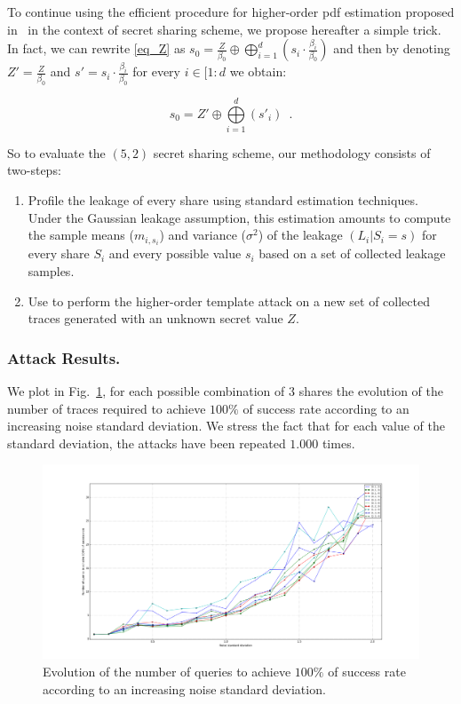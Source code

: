 \documentclass{llncs}
\begin{document}
To continue using the efficient procedure for higher-order pdf estimation proposed in~\cite{LPRRT14} in the context of secret sharing scheme, we propose hereafter a simple trick. In fact, we can rewrite \eqref{eq_Z} as $s_0=\frac{Z}{\beta_0}\oplus\bigoplus\limits_{i=1}^{d} (s_i \cdot \frac{\beta_i}{\beta_0})$ and then by denoting $Z'=\frac{Z}{\beta_0}$ and $s'=s_i \cdot \frac{\beta_i}{\beta_0}$ for every $i \in [ 1: d$ we obtain:

\begin{equation*}
s_0= Z' \oplus \bigoplus\limits_{i=1}^{d} (s'_i) \enspace.
\end{equation*}

So to evaluate the $(5,2)$ secret sharing scheme, our methodology consists of two-steps:

\begin{enumerate}
\item Profile the leakage of every share using standard estimation techniques. Under the Gaussian leakage assumption, this estimation amounts to compute the sample means ($m_{i,s_i}$) and variance ($\sigma^2$) of the leakage $(L_i | S_i = s)$ for every share $S_i$ and every possible value $s_i$ based on a set of collected leakage samples.
\item Use \label{eq_pdf} to perform the higher-order template attack on a new set of collected traces generated with an unknown secret value $Z$.
\end{enumerate} 

\subsubsection{Attack Results.} 

We plot in Fig.~\ref{fig_3_shares}, for each possible combination of $3$ shares the evolution of the number of traces required to achieve $100\%$ of success rate according to an increasing noise standard deviation. We stress the fact that for each value of the standard deviation, the attacks have been repeated $1.000$ times.  

\begin{figure}
\begin{center}
\includegraphics[width=1\textwidth]{Figure/res_125_246_119_104_150.png}
\caption{Evolution of the number of queries to achieve $100\%$ of success rate according to an increasing noise standard deviation.}
\label{fig_3_shares}
\end{center}
\end{figure}
\end{document}
